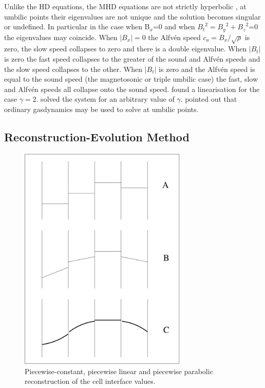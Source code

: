 Unlike the HD equations, the MHD equations are not strictly hyperbolic \citep{1988JCoPh..75..400B}, at umbilic points their eigenvalues are not unique and the solution becomes singular or undefined.
In particular in the case when B$_x$=0 and when ${B_t}^2={B_y}^2 + {B_z}^2$=0 the eigenvalues may coincide.
When $|B_x|=0 $ the Alfv\'en speed $c_a = B_x / \sqrt{\rho}$ is zero, the slow speed collapses to zero and there is a double eigenvalue.
When $|B_t|$ is zero the fast speed collapses to the greater of the sound and Alfv\'en speeds and the slow speed collapses to the other.
When $|B_t|$ is zero and the Alfv\'en speed is equal to the sound speed (the magnetosonic or triple umbilic case) the fast, slow and Alfv\'en speeds all collapse onto the sound speed.
\citet{1988JCoPh..75..400B} found a linearisation for the case $\gamma = 2$.
\citet{Roe:1996:NEM} solved the system for an arbitrary value of $\gamma$.
\citet{1998MNRAS.297..265F} pointed out that ordinary gasdynamics may be used to solve at umbilic points.


\subsection{Reconstruction-Evolution Method}


\begin{figure}[t]
\centering
\includegraphics[width=8cm]{Reconstruction}
\caption{
Piecewise-constant, piecewise linear and piecewise parabolic reconstruction of the cell interface values.
}
\label{fig:Reconstruction} %
\end{figure}


